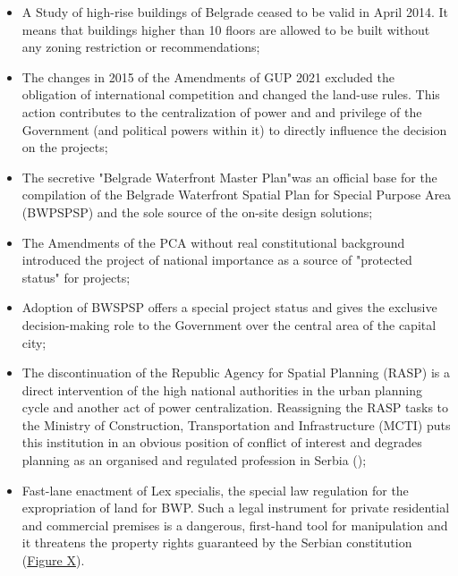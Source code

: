 \documentclass[11pt]{report}
\begin{document}
{{{\begin{itemize}

\item A Study of high-rise buildings of Belgrade ceased to be valid in April 2014. It means that buildings higher than 10 floors are allowed to be built without any zoning restriction or recommendations;

\item The changes in 2015 of the Amendments of GUP 2021 excluded the obligation of international competition and changed the land-use rules. This action contributes to the centralization of power and and privilege of the Government (and political powers within it) to directly influence the decision on the projects;

\item The secretive "Belgrade Waterfront Master Plan"was an official base for the compilation of the Belgrade Waterfront Spatial Plan for Special Purpose Area (BWPSPSP) and the sole source of the on-site design solutions;

\item  The Amendments of the PCA without real constitutional background introduced the project of national importance as a source of "protected status" for projects;

\item Adoption of BWSPSP offers a special project status and gives the exclusive decision-making role to the Government over the central area of the capital city; 

\item The discontinuation of the Republic Agency for Spatial Planning (RASP) is a direct intervention of the high national authorities in the urban planning cycle and another act of power centralization.
Reassigning the RASP tasks to the Ministry of Construction, Transportation and Infrastructure (MCTI) puts this institution in an obvious position of conflict of interest and degrades  planning as an organised and regulated profession in Serbia (\href{Stojkov}{\citealt{stojkov_sahrana_2015}});

\item Fast-lane enactment of Lex specialis, the special law regulation for the expropriation of land for BWP. Such a legal instrument for private residential and commercial premises is a dangerous, first-hand tool for manipulation and it threatens the property rights guaranteed by the Serbian constitution (\href{Figure Timeline BWP}{Figure X}).


\end{itemize}}}}
\end{document}
